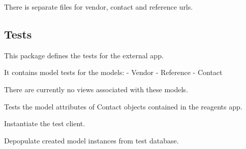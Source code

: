 \documentclass[letterpaper,10pt,english]{sphinxmanual}
\begin{document}
There is separate files for vendor, contact and reference urls.


\subsection{Tests}
\label{api:id12}\label{api:module-experimentdb.external.tests}
This package defines the tests for the external app.

It contains model tests for the models:
- Vendor
- Reference
- Contact

There are currently no views associated with these models.

\begin{fulllineitems}
\label{api:experimentdb.external.tests.ContactModelTests}
Tests the model attributes of Contact objects contained in the reagents app.

\begin{fulllineitems}
\label{api:experimentdb.external.tests.ContactModelTests.setUp}
Instantiate the test client.

\end{fulllineitems}


\begin{fulllineitems}
\label{api:experimentdb.external.tests.ContactModelTests.tearDown}
Depopulate created model instances from test database.

\end{fulllineitems}


\begin{fulllineitems}
\label{api:experimentdb.external.tests.ContactModelTests.test_contact_absolute_url}
\end{fulllineitems}



\end{fulllineitems}
\end{document}
